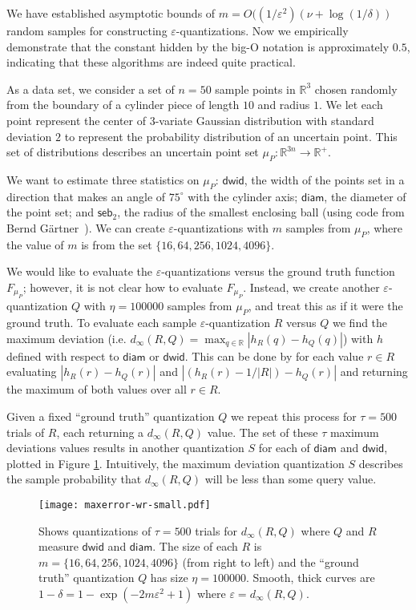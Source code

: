 \documentclass{journal}
\newcommand{\eps}{\varepsilon}
\renewcommand{\b}[1]{\ensuremath{\mathbb{#1}}}
\newcommand{\diameter}{\ensuremath{\textsf{diam}}}
\newcommand{\seb}{\ensuremath{\textsf{seb}_2}}
\newcommand{\dwid}{\ensuremath{\textsf{dwid}}}
\begin{document}
We have established asymptotic bounds of $m = O((1/\eps^2)(\nu + \log (1/\delta))$ random samples for constructing $\eps$-quantizations.  Now we empirically demonstrate that the constant hidden by the big-O notation is approximately $0.5$, indicating that these algorithms are indeed quite practical.

As a data set, we consider a set of $n = 50$ sample points in $\b{R}^3$ chosen randomly from the boundary of a cylinder piece of length $10$ and radius $1$.  We let each point represent the center of 3-variate Gaussian distribution with standard deviation $2$ to represent the probability distribution of an uncertain point.  This set of distributions describes an uncertain point set $\mu_P : \b{R}^{3n} \to \b{R}^+$.

We want to estimate three statistics on $\mu_P$:
$\dwid$, the width of the points set in a direction that makes an angle of $75^\circ$ with the cylinder axis;
$\diameter$, the diameter of the point set;
and $\seb$, the radius of the smallest enclosing ball (using code from Bernd G\"{a}rtner~\cite{Gar99}).
We can create $\eps$-quantizations with $m$ samples from $\mu_P$, where the value of $m$ is from the set $\{16, 64, 256, 1024, 4096\}$.

We would like to evaluate the $\eps$-quantizations versus the ground truth function $F_{\mu_P}$; however, it is not clear how to evaluate $F_{\mu_P}$.  Instead, we create another $\eps$-quantization $Q$ with $\eta = 100 000$ samples from $\mu_P$, and treat this as if it were the ground truth.
To evaluate each sample $\eps$-quantization $R$ versus $Q$ we find the maximum deviation (i.e. $d_\infty(R,Q) = \max_{q \in \b{R}} |h_R(q) - h_Q(q)|$) with $h$ defined with respect to $\diameter$ or $\dwid$.  This can be done by for each value $r \in R$ evaluating $|h_R(r) - h_Q(r)|$ and $|(h_R(r) - 1/|R|) - h_Q(r)|$ and returning the maximum of both values over all $r \in R$.  

Given a fixed ``ground truth'' quantization $Q$ we repeat this process for $\tau= 500$ trials of $R$, each returning a $d_\infty(R,Q)$ value.  The set of these $\tau$ maximum deviations values results in another quantization $S$ for each of $\diameter$ and $\dwid$, plotted in Figure \ref{fig:maxerr-dwr}.
Intuitively, the maximum deviation quantization $S$ describes the sample probability that $d_\infty(R,Q)$ will be less than some query value.

\begin{figure}[tbh]
\begin{center}
\texttt{[image: maxerror-wr-small.pdf]}
\end{center}
\caption{\label{fig:maxerr-dwr}
Shows quantizations of $\tau=500$ trials for $d_\infty(R,Q)$ where $Q$ and $R$ measure $\dwid$ and $\diameter$.  The size of each $R$ is $m = \{16, 64, 256, 1024, 4096\}$ (from right to left) and the ``ground truth'' quantization $Q$ has size $\eta = 100 000$.  Smooth, thick curves are $1-\delta = 1-\exp(-2 m \eps^2 + 1)$ where $\eps = d_\infty(R,Q)$.  }
\end{figure}
\end{document}

